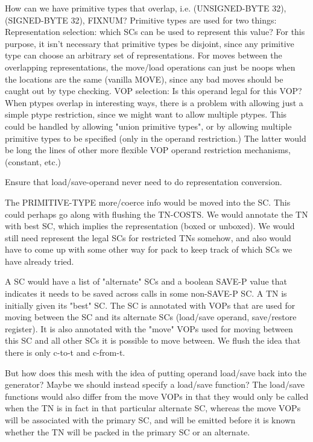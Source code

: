 How can we have primitive types that overlap, i.e. (UNSIGNED-BYTE 32),
(SIGNED-BYTE 32), FIXNUM?
Primitive types are used for two things:
    Representation selection: which SCs can be used to represent this value?
	For this purpose, it isn't necessary that primitive types be disjoint,
	since any primitive type can choose an arbitrary set of
	representations.  For moves between the overlapping representations,
	the move/load operations can just be noops when the locations are the
	same (vanilla MOVE), since any bad moves should be caught out by type
	checking.
    VOP selection:
	Is this operand legal for this VOP?  When ptypes overlap in interesting
	ways, there is a problem with allowing just a simple ptype restriction,
	since we might want to allow multiple ptypes.  This could be handled
	by allowing "union primitive types", or by allowing multiple primitive
	types to be specified (only in the operand restriction.)  The latter
	would be long the lines of other more flexible VOP operand restriction
	mechanisms, (constant, etc.)



Ensure that load/save-operand never need to do representation conversion.

The PRIMITIVE-TYPE more/coerce info would be moved into the SC.  This could
perhaps go along with flushing the TN-COSTS.  We would annotate the TN with
best SC, which implies the representation (boxed or unboxed).  We would still
need represent the legal SCs for restricted TNs somehow, and also would have to
come up with some other way for pack to keep track of which SCs we have already
tried.

A SC would have a list of "alternate" SCs and a boolean SAVE-P value that
indicates it needs to be saved across calls in some non-SAVE-P SC.  A TN is
initially given its "best" SC.  The SC is annotated with VOPs that are used for
moving between the SC and its alternate SCs (load/save operand, save/restore
register).  It is also annotated with the "move" VOPs used for moving between
this SC and all other SCs it is possible to move between.  We flush the idea
that there is only c-to-t and c-from-t.

But how does this mesh with the idea of putting operand load/save back into the
generator?  Maybe we should instead specify a load/save function?  The
load/save functions would also differ from the move VOPs in that they would
only be called when the TN is in fact in that particular alternate SC, whereas
the move VOPs will be associated with the primary SC, and will be emitted
before it is known whether the TN will be packed in the primary SC or an
alternate.

